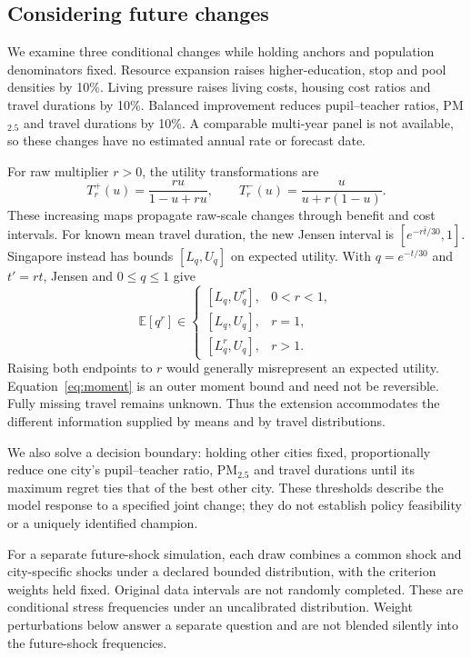 \subsection{Considering future changes}
We examine three conditional changes while holding anchors and population
denominators fixed. Resource expansion raises higher-education, stop and pool
densities by 10\%. Living pressure raises living costs, housing cost ratios and
travel durations by 10\%. Balanced improvement reduces pupil--teacher ratios,
PM$_{2.5}$ and travel durations by 10\%. A comparable multi-year panel is not
available, so these changes have no estimated annual rate or forecast date.

For raw multiplier $r>0$, the utility transformations are
\begin{equation}
 T_r^{+}(u)=\frac{ru}{1-u+ru},\qquad
 T_r^{-}(u)=\frac{u}{u+r(1-u)}.
\end{equation}
These increasing maps propagate raw-scale changes through benefit and cost
intervals. For known mean travel duration, the new Jensen interval is
$[e^{-r\bar t/30},1]$. Singapore instead has bounds $[L_q,U_q]$ on expected
utility. With $q=e^{-t/30}$ and $t'=rt$, Jensen and $0\leq q\leq1$ give
\begin{equation}
 \mathbb E[q^r]\in
 \begin{cases}
 [L_q,U_q^r],&0<r<1,\\
 [L_q,U_q],&r=1,\\
 [L_q^r,U_q],&r>1.
 \end{cases}
 \label{eq:moment}
\end{equation}
Raising both endpoints to $r$ would generally misrepresent an expected utility.
Equation~\ref{eq:moment} is an outer moment bound and need not be reversible.
Fully missing travel remains unknown. Thus the extension accommodates the
different information supplied by means and by travel distributions.

\FutureDeterministic
We also solve a decision boundary: holding other cities fixed, proportionally
reduce one city's pupil--teacher ratio, PM$_{2.5}$ and travel durations until
its maximum regret ties that of the best other city. \FutureThresholds
These thresholds describe the model response to a specified joint change;
they do not establish policy feasibility or a uniquely identified champion.
\PragueThresholdChange

For a separate future-shock simulation, each draw combines a common shock and
city-specific shocks under a declared bounded distribution, with the criterion
weights held fixed. Original data intervals are not randomly completed.
\FutureMonteCarlo
\ProxyWithdrawalMC
These are conditional stress frequencies under an uncalibrated distribution.
Weight perturbations below answer a separate question and are not blended
silently into the future-shock frequencies.

